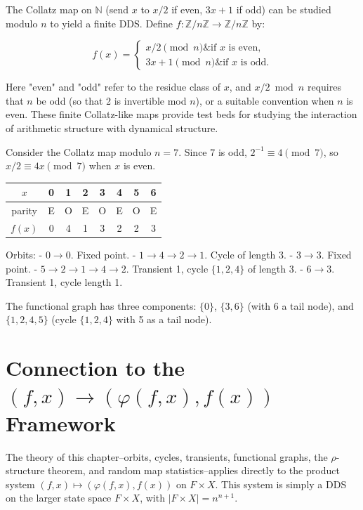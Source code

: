 The Collatz map on $\mathbb{N}$ (send $x$ to $x/2$ if even, $3x+1$ if odd) can be studied modulo $n$ to yield a finite DDS. Define $f: \mathbb{Z}/n\mathbb{Z} \to \mathbb{Z}/n\mathbb{Z}$ by:

\[f(x) = \begin{cases} x/2 \pmod{n} \& \text{if } x \text{ is even,} \\ 3x + 1 \pmod{n} \& \text{if } x \text{ is odd.} \end{cases}\]

Here "even" and "odd" refer to the residue class of $x$, and $x/2 \bmod n$ requires that $n$ be odd (so that 2 is invertible mod $n$), or a suitable convention when $n$ is even. These finite Collatz-like maps provide test beds for studying the interaction of arithmetic structure with dynamical structure.

\begin{example}
Consider the Collatz map modulo $n = 7$. Since 7 is odd, $2^{-1} \equiv 4 \pmod{7}$, so $x/2 \equiv 4x \pmod{7}$ when $x$ is even.

\begin{center}
\begin{tabular}{cccccccc}
\toprule
$x$ & 0 & 1 & 2 & 3 & 4 & 5 & 6 \\
\midrule
parity & E & O & E & O & E & O & E \\
$f(x)$ & 0 & 4 & 1 & 3 & 2 & 2 & 3 \\
\bottomrule
\end{tabular}
\end{center}

Orbits:
- $0 \to 0$. Fixed point.
- $1 \to 4 \to 2 \to 1$. Cycle of length 3.
- $3 \to 3$. Fixed point.
- $5 \to 2 \to 1 \to 4 \to 2$. Transient 1, cycle $\{ 1, 2, 4\} $ of length 3.
- $6 \to 3$. Transient 1, cycle length 1.

The functional graph has three components: $\{ 0\} $, $\{ 3, 6\} $ (with 6 a tail node), and $\{ 1, 2, 4, 5\} $ (cycle $\{ 1,2,4\} $ with 5 as a tail node).
\end{example}

\section{Connection to the $(f, x) \to (\varphi(f,x), f(x))$ Framework}

The theory of this chapter--orbits, cycles, transients, functional graphs, the $\rho$-structure theorem, and random map statistics--applies directly to the product system $(f, x) \mapsto (\varphi(f,x), f(x))$ on $F \times X$. This system is simply a DDS on the larger state space $F \times X$, with $|F \times X| = n^{n+1}$.

